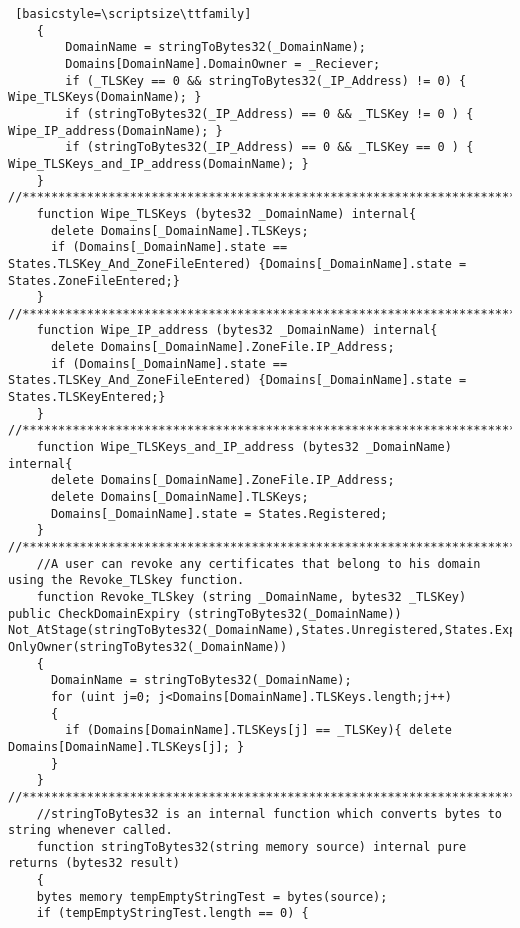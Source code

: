 \begin{lstlisting} [basicstyle=\scriptsize\ttfamily]
    {
        DomainName = stringToBytes32(_DomainName);
        Domains[DomainName].DomainOwner = _Reciever;
        if (_TLSKey == 0 && stringToBytes32(_IP_Address) != 0) { Wipe_TLSKeys(DomainName); }
        if (stringToBytes32(_IP_Address) == 0 && _TLSKey != 0 ) {  Wipe_IP_address(DomainName); }
        if (stringToBytes32(_IP_Address) == 0 && _TLSKey == 0 ) { Wipe_TLSKeys_and_IP_address(DomainName); }
    }
//************************************************************************************************************************//
    function Wipe_TLSKeys (bytes32 _DomainName) internal{
      delete Domains[_DomainName].TLSKeys;
      if (Domains[_DomainName].state == States.TLSKey_And_ZoneFileEntered) {Domains[_DomainName].state = States.ZoneFileEntered;}
    }
//************************************************************************************************************************//
    function Wipe_IP_address (bytes32 _DomainName) internal{
      delete Domains[_DomainName].ZoneFile.IP_Address;
      if (Domains[_DomainName].state == States.TLSKey_And_ZoneFileEntered) {Domains[_DomainName].state = States.TLSKeyEntered;}
    }
//************************************************************************************************************************//
    function Wipe_TLSKeys_and_IP_address (bytes32 _DomainName) internal{
      delete Domains[_DomainName].ZoneFile.IP_Address;
      delete Domains[_DomainName].TLSKeys;
      Domains[_DomainName].state = States.Registered;
    }
//************************************************************************************************************************//
    //A user can revoke any certificates that belong to his domain using the Revoke_TLSkey function.
    function Revoke_TLSkey (string _DomainName, bytes32 _TLSKey) public CheckDomainExpiry (stringToBytes32(_DomainName)) Not_AtStage(stringToBytes32(_DomainName),States.Unregistered,States.Expired) OnlyOwner(stringToBytes32(_DomainName))
    {
      DomainName = stringToBytes32(_DomainName);
      for (uint j=0; j<Domains[DomainName].TLSKeys.length;j++)
      {
        if (Domains[DomainName].TLSKeys[j] == _TLSKey){ delete Domains[DomainName].TLSKeys[j]; }
      }
    }
//************************************************************************************************************************//
    //stringToBytes32 is an internal function which converts bytes to string whenever called.
    function stringToBytes32(string memory source) internal pure returns (bytes32 result)
    {
    bytes memory tempEmptyStringTest = bytes(source);
    if (tempEmptyStringTest.length == 0) {

\end{lstlisting}
